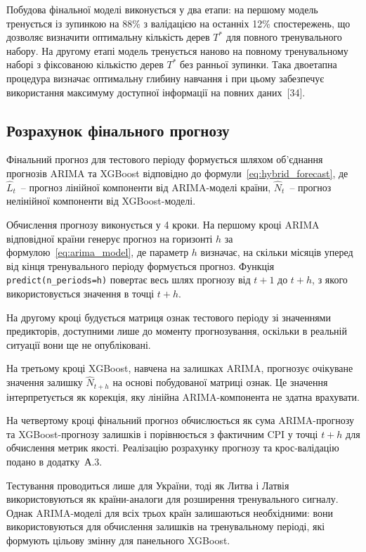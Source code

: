 \documentclass{bachelor_thesis}
\begin{document}
Побудова фінальної моделі виконується у два етапи: на першому модель тренується із зупинкою на 88\% з валідацією на останніх 12\% спостережень, що дозволяє визначити оптимальну кількість дерев $T^*$ для повного тренувального набору. На другому етапі модель тренується наново на повному тренувальному наборі з фіксованою кількістю дерев $T^*$ без ранньої зупинки. Така двоетапна процедура визначає оптимальну глибину навчання і при цьому забезпечує використання максимуму доступної інформації на повних даних~[34].

\subsection{Розрахунок фінального прогнозу}

Фінальний прогноз для тестового періоду формується шляхом об'єднання прогнозів ARIMA та XGBoost відповідно до формули~\eqref{eq:hybrid_forecast}, де $\hat{L}_t$~-- прогноз лінійної компоненти від ARIMA-моделі країни, $\hat{N}_t$~-- прогноз нелінійної компоненти від XGBoost-моделі.

Обчислення прогнозу виконується у 4 кроки. На першому кроці ARIMA відповідної країни генерує прогноз на горизонті $h$ за формулою~\eqref{eq:arima_model}, де параметр $h$ визначає, на скільки місяців уперед від кінця тренувального періоду формується прогноз. Функція \texttt{predict(n\_periods=h)} повертає весь шлях прогнозу від $t+1$ до $t+h$, з якого використовується значення в точці $t+h$.

На другому кроці будується матриця ознак тестового періоду зі значеннями предикторів, доступними лише до моменту прогнозування, оскільки в реальній ситуації вони ще не опубліковані.

На третьому кроці XGBoost, навчена на залишках ARIMA, прогнозує очікуване значення залишку $\hat{N}_{t+h}$ на основі побудованої матриці ознак. Це значення інтерпретується як корекція, яку лінійна ARIMA-компонента не здатна врахувати.

На четвертому кроці фінальний прогноз обчислюється як сума ARIMA-прогнозу та XGBoost-прогнозу залишків і порівнюється з фактичним CPI у точці $t+h$ для обчислення метрик якості. Реалізацію розрахунку прогнозу та крос-валідацію подано в додатку~А.3.

Тестування проводиться лише для України, тоді як Литва і Латвія використовуються як країни-аналоги для розширення тренувального сигналу. Однак ARIMA-моделі для всіх трьох країн залишаються необхідними: вони використовуються для обчислення залишків на тренувальному періоді, які формують цільову змінну для панельного XGBoost.
\end{document}
